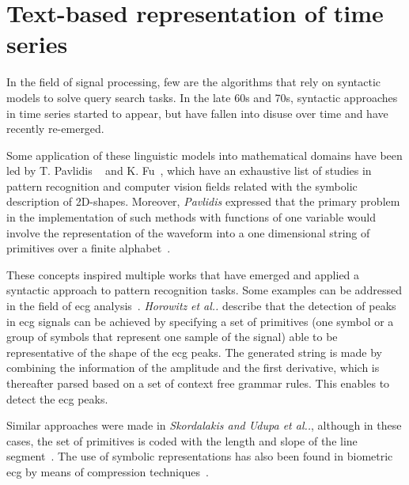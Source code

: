 \section{Text-based representation of time series}

In the field of signal processing, few are the algorithms that rely on syntactic models to solve query search tasks. In the late 60s and 70s, syntactic approaches in time series started to appear, but have fallen into disuse over time and have recently re-emerged.
\par
Some application of these linguistic models into mathematical domains  have been led by T. Pavlidis ~\cite{pavlidis1,pavlidis2} and K. Fu~\cite{kfu7}, which have an exhaustive list of studies in pattern recognition and computer vision fields related with the symbolic description of 2D-shapes. Moreover, \textit{Pavlidis} expressed that the primary problem in the implementation of such methods with functions of one variable would involve the representation of the waveform into a one dimensional string of primitives over a finite alphabet~\cite{pavlidis2}.
\par
These concepts inspired multiple works that have emerged and applied a syntactic approach to pattern recognition tasks. Some examples can be addressed in the field of \gls{ecg} analysis~\cite{Horowitz, Udupa, Skordalakis, DCtnh}. \textit{Horowitz} \textit{et al..} describe that the detection of peaks in \gls{ecg} signals can be achieved by specifying a set of primitives (one symbol or a group of symbols that represent one sample of the signal) able to be representative of the shape of the \gls{ecg} peaks. The generated string is made by combining the information of the amplitude and the first derivative, which is thereafter parsed based on a set of context free grammar rules. This enables to detect the \gls{ecg} peaks. 
\par
Similar approaches were made in \textit{Skordalakis and Udupa et al..}, although in these cases, the set of primitives is coded with the length and slope of the line segment~\cite{Udupa,Skordalakis}. The use of symbolic representations has also been found in biometric \gls{ecg} by means of compression techniques~\cite{DCtnh}. 
\par
